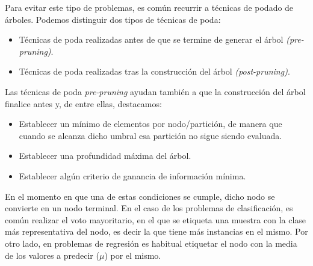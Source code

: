 Para evitar este tipo de problemas, es común recurrir a técnicas de podado de árboles. Podemos distinguir dos tipos de técnicas de poda:\\

\begin{itemize}
	\item Técnicas de poda realizadas antes de que se termine de generar el árbol \textit{(pre-pruning)}.
	\item Técnicas de poda realizadas tras la construcción del árbol \textit{(post-pruning)}.\\
\end{itemize}

Las técnicas de poda \textit{pre-pruning} ayudan también a que la construcción del árbol finalice antes y, de entre ellas, destacamos:\\

\begin{itemize}
	\item Establecer un mínimo de elementos por nodo/partición, de manera que cuando se alcanza dicho umbral esa partición no sigue siendo evaluada.
	\item Establecer una profundidad máxima del árbol.
	\item Establecer algún criterio de ganancia de información mínima.\\
\end{itemize}

En el momento en que una de estas condiciones se cumple, dicho nodo se convierte en un nodo terminal. En el caso de los problemas de clasificación, es común realizar el voto mayoritario, en el que se etiqueta una muestra con la clase más representativa del nodo, es decir la que tiene más instancias en el mismo. Por otro lado, en problemas de regresión es habitual etiquetar el nodo con la media de los valores a predecir ($\mu$) por el mismo.\\


